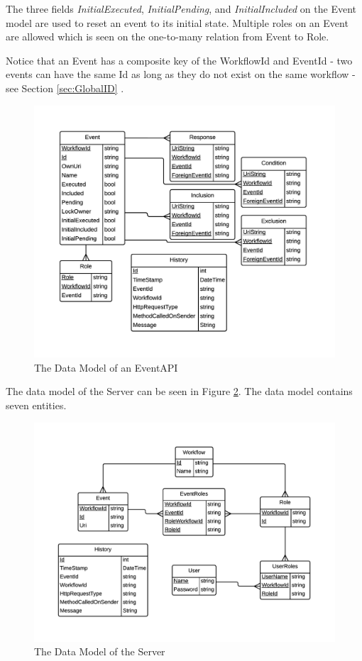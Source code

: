 The three fields \textit{InitialExecuted}, \textit{InitialPending}, and \textit{InitialIncluded} on the Event model are used to reset an event to its initial state. Multiple roles on an Event are allowed which is seen on the one-to-many relation from Event to Role. 

Notice that an Event has a composite key of the WorkflowId and EventId - two events can have the same Id as long as they do not exist on the same workflow - see Section \ref{sec:GlobalID} .\\

\begin{figure}[h!]
\centering
\includegraphics[width=\linewidth]{figures/DatamodelEvent}
\caption{\label{fig:EventAPIDataModel}The Data Model of an EventAPI}
\end{figure}

The data model of the Server can be seen in Figure \ref{fig:ServerDataModel}. The data model contains seven entities. 

\begin{figure}[h!]
\centering
\includegraphics[width=\linewidth]{figures/EFDatamodelServer}
\caption{\label{fig:ServerDataModel}The Data Model of the Server}
\end{figure}

